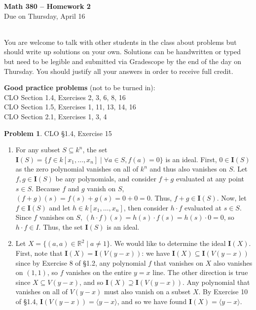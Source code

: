 \documentclass[12pt]{amsart}
\theoremstyle{definition}
\newtheorem{prob}{Problem}
\begin{document}
 \thispagestyle{empty}
\begin{center} {\large \textbf{Math 380 -- Homework  2}} \smallskip \\ 
Due on Thursday, April 16\ \\ \ \\
 \end{center}

You are welcome to talk with other students in the class about problems but should write up solutions on your own. 
Solutions can be handwritten or typed but need to be legible and submitted via Gradescope by the end of the day 
on Thursday. You should justify all your answers in order to receive full credit.  
\bigskip 

\begin{flushleft}

{\bf Good practice problems} (not to be turned in): \\

CLO Section 1.4, Exercises 2, 3, 6, 8, 16\\

CLO Section 1.5, Exercises 1, 11, 13, 14, 16\\
CLO Section 2.1, Exercises 1, 3, 4\\
\bigskip 




\begin{prob} CLO \S1.4, Exercise 15 \smallskip \\
\begin{enumerate}
    \item[a.] For any subset $S \subseteq k^n$, the set $\mathbf I(S) = \{f \in k[x_1,\dots,x_n] \mid \forall a \in S, f(a) = 0 \}$ is an ideal. First, $0 \in \mathbf I(S)$ as the zero polynomial vanishes on all of $k^n$ and thus also vanishes on $S$. Let $f,g \in \mathbf I(S)$ be any polynomials, and consider $f+g$ evaluated at any point $s \in S$. Because $f$ and $g$ vanish on $S$, $(f+g)(s)=f(s)+g(s)=0+0=0$. Thus, $f+g \in \mathbf I(S)$. Now, let $f \in \mathbf I(S)$ and let $h\in k[x_1,\dots,x_n]$, then consider $h \cdot f$ evaluated at $s \in S$. Since $f$ vanishes on $S$, $(h \cdot f)(s) = h(s)\cdot f(s)=h(s)\cdot 0 = 0$, so $h\cdot f \in I$. Thus, the set $\mathbf I(S)$ is an ideal.
    \item[b.] Let $X = \{(a,a) \in \mathbb R^2 \mid a \ne 1 \}$. We would like to determine the ideal $\mathbf I(X)$. First, note that $\mathbf I(X) = \mathbf I(V(y-x))$: we have $\mathbf I(X) \subseteq \mathbf I(V(y-x))$ since by Exercise 8 of \S 1.2, any polynomial $f$ that vanishes on $X$ also vanishes on $(1,1)$, so $f$ vanishes on the entire $y=x$ line. The other direction is true since $X \subseteq V(y-x)$, and so $\mathbf I(X) \supseteq \mathbf I(V(y-x))$. Any polynomial that vanishes on all of $V(y-x)$ must also vanish on a subset $X$. By Exercise 10 of \S 1.4, $\mathbf I(V(y-x)) = \langle y-x\rangle$, and so we have found $\mathbf I(X) = \langle y-x\rangle$. 
    

\end{enumerate}
\end{prob}
\end{flushleft}
\end{document}
